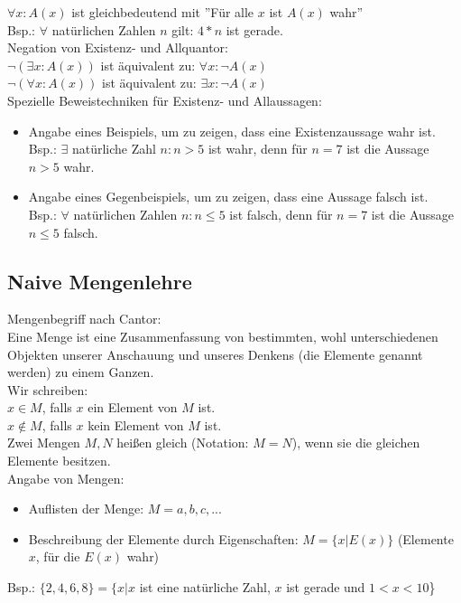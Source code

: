\documentclass[10pt,a4paper,numbers=endperiod]{scrartcl}
\theoremstyle{definition}
\begin{document}
$\forall x: A(x)$ ist gleichbedeutend mit ''Für alle $x$ ist $A(x)$ wahr''\\
Bsp.: $\forall$ natürlichen Zahlen $n$ gilt: $4*n$ ist gerade.\\

Negation von Existenz- und Allquantor:\\
$\neg(\exists x:A(x))$ ist äquivalent zu: $\forall x: \neg A(x)$\\
$\neg(\forall x:A(x))$ ist äquivalent zu: $\exists x: \neg A(x)$\\
Spezielle Beweistechniken für Existenz- und Allaussagen: 
\begin{itemize}
	\item Angabe eines Beispiels, um zu zeigen, dass eine Existenzaussage wahr ist.\\
	Bsp.: $\exists$ natürliche Zahl $n: n>5$ ist wahr, denn für $n=7$ ist die Aussage $n>5$ wahr.
	\item Angabe eines Gegenbeispiels, um zu zeigen, dass eine Aussage falsch ist.\\
	Bsp.: $\forall$ natürlichen Zahlen $n: n \leq 5$ ist falsch, denn für $n=7$ ist die Aussage $n \leq 5$ falsch. 
\end{itemize}

\subsection{Naive Mengenlehre}
\vspace{\baselineskip}

Mengenbegriff nach Cantor:\\ 
Eine Menge ist eine Zusammenfassung von bestimmten, wohl unterschiedenen Objekten unserer Anschauung und unseres Denkens (die Elemente genannt werden) zu einem Ganzen.\\

Wir schreiben:\\
$x \in M$, falls $x$ ein Element von $M$ ist.\\
$x \notin M$, falls $x$ kein Element von $M$ ist.\\

Zwei Mengen $M,N$ heißen gleich (Notation: $M=N$), wenn sie die gleichen Elemente besitzen.\\

Angabe von Mengen:
\begin{itemize}
	\item Auflisten der Menge: $M={a,b,c,...}$
	\item Beschreibung der Elemente durch Eigenschaften: $M=\{x|E(x)\}$ (Elemente $x$, für die $E(x)$ wahr)
\end{itemize}
Bsp.: $\{2,4,6,8\}=\{x|x$ ist eine natürliche Zahl, $x$ ist gerade und $1<x<10$\}\\
\end{document}
